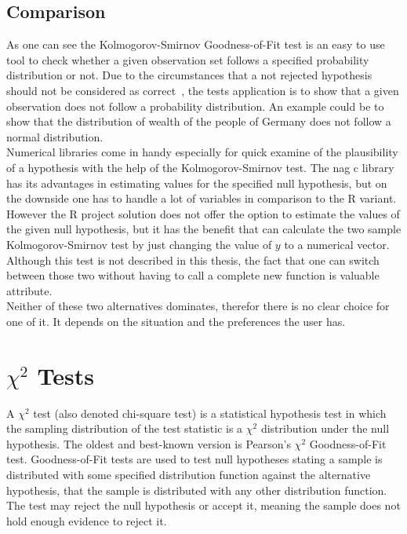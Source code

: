 \documentclass{article}
\theoremstyle{definition}
\begin{document}
\subsection{Comparison}
As one can see the Kolmogorov-Smirnov Goodness-of-Fit test is an easy to use tool to check whether a given observation set follows a specified probability distribution or not.
Due to the circumstances that a not rejected hypothesis should not be considered as correct~\cite{conover1980practical}, the tests application is to show that a given observation does not follow a probability distribution. An example could be to show that the distribution of wealth of the people of Germany does not follow a normal distribution.\\
Numerical libraries come in handy especially for quick examine of the plausibility of a hypothesis with the help of the Kolmogorov-Smirnov test. The nag c library has its advantages 
in estimating values for the specified null hypothesis, but on the downside one has to handle a lot of variables in comparison to the R variant. However the R project solution does not offer the option to estimate the values of the given null hypothesis, but it has the benefit that can calculate the two sample Kolmogorov-Smirnov test by just changing the value of $y$ to a numerical vector. Although this test is not described in this thesis, the fact that one can switch between those two without having to call a complete new function is valuable attribute.\\
Neither of these two alternatives dominates, therefor there is no clear choice for one of it. It depends on the situation and the preferences the user has. 
\section{$\chi^2$ Tests}
A $\chi^2$ test (also denoted chi-square test) is a statistical hypothesis test in which the sampling distribution of the test statistic is a $\chi^2$ distribution under the null hypothesis.
The oldest and best-known version is Pearson's $\chi^2$ Goodness-of-Fit test.
Goodness-of-Fit tests are used to test null hypotheses stating a sample is distributed with some specified distribution function against the alternative hypothesis, that the sample is distributed with any other distribution function.
The test may reject the null hypothesis or accept it, meaning the sample does not hold enough evidence to reject it.
\end{document}
